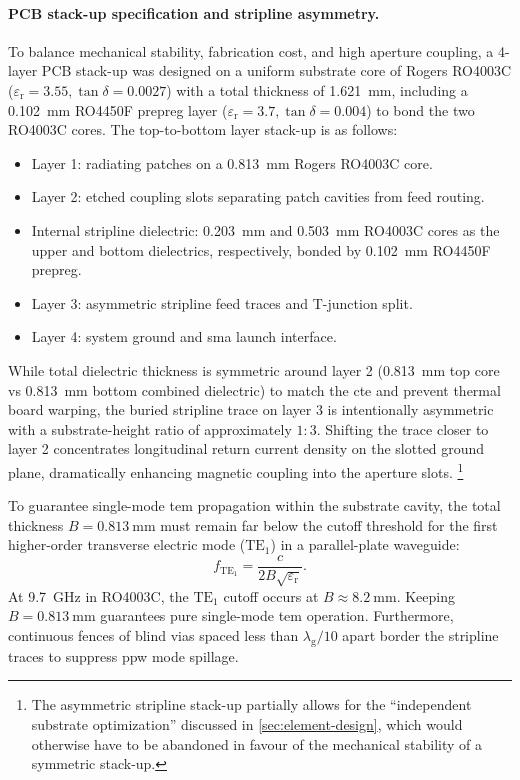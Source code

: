 \paragraph{PCB stack-up specification and stripline asymmetry.}
To balance mechanical stability, fabrication cost, and high aperture coupling, a 4-layer PCB stack-up was designed on a uniform substrate core of Rogers RO4003C ($\varepsilon_{\mathrm{r}} = 3.55, \tan\delta = 0.0027$) with a total thickness of \qty{1.621}{\milli\metre}, including a \qty{0.102}{\milli\metre} RO4450F prepreg layer ($\varepsilon_{\mathrm{r}} = 3.7, \tan\delta = 0.004$) to bond the two RO4003C cores.
The top-to-bottom layer stack-up is as follows:
\begin{itemize}
    \item Layer 1: radiating patches on a \qty{0.813}{\milli\metre} Rogers RO4003C core.
    \item Layer 2: etched coupling slots separating patch cavities from feed routing.
    \item Internal stripline dielectric: \qty{0.203}{\milli\metre} and \qty{0.503}{\milli\metre} RO4003C cores as the upper and bottom dielectrics, respectively, bonded by \qty{0.102}{\milli\metre} RO4450F prepreg.
    \item Layer 3: asymmetric stripline feed traces and T-junction split.
    \item Layer 4: system ground and \gls{sma} launch interface.
\end{itemize}

While total dielectric thickness is symmetric around layer 2 (\qty{0.813}{\milli\metre} top core vs \qty{0.813}{\milli\metre} bottom combined dielectric) to match the \gls{cte} and prevent thermal board warping, the buried stripline trace on layer 3 is intentionally asymmetric with a substrate-height ratio of approximately $1:3$.
Shifting the trace closer to layer 2 concentrates longitudinal return current density on the slotted ground plane, dramatically enhancing magnetic coupling into the aperture slots.%
    \footnote{The asymmetric stripline stack-up partially allows for the \enquote{independent substrate optimization} discussed in \cref{sec:element-design}, which would otherwise have to be abandoned in favour of the mechanical stability of a symmetric stack-up.}

To guarantee single-mode \gls{tem} propagation within the substrate cavity, the total thickness $B = \qty{0.813}{\milli\metre}$ must remain far below the cutoff threshold for the first higher-order transverse electric mode ($\text{TE}_1$) in a parallel-plate waveguide:
\begin{equation}
    \label{eq:ppw-cutoff}
    f_{\text{TE}_1} = \frac{c}{2 B \sqrt{\varepsilon_{\mathrm{r}}}}.
\end{equation}
At \qty{9.7}{\giga\hertz} in RO4003C, the $\text{TE}_1$ cutoff occurs at $B \approx \qty{8.2}{\milli\metre}$.
Keeping $B = \qty{0.813}{\milli\metre}$ guarantees pure single-mode \gls{tem} operation.
Furthermore, continuous fences of blind vias spaced less than $\lambda_{\mathrm{g}}/10$ apart border the stripline traces to suppress \gls{ppw} mode spillage.

